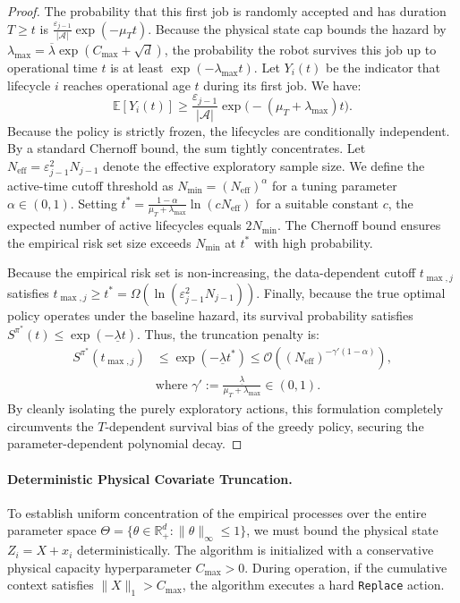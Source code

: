 \documentclass[letterpaper, 10 pt, conference]{IEEEconf}
\begin{document}
\begin{proof}
    The probability that this first job is randomly accepted and has duration $T \ge t$ is $\frac{\varepsilon_{j-1}}{|\mathcal{A}|} \exp(-\mu_T t)$. Because the physical state cap bounds the hazard by $\lambda_{\max} = \overline{\lambda}\exp(C_{\max} + \sqrt{d})$, the probability the robot survives this job up to operational time $t$ is at least $\exp(-\lambda_{\max} t)$. Let $Y_i(t)$ be the indicator that lifecycle $i$ reaches operational age $t$ during its first job. We have:
    \begin{equation}
        \mathbb{E}[Y_i(t)] \ge \frac{\varepsilon_{j-1}}{|\mathcal{A}|} \exp\big(-(\mu_T + \lambda_{\max})t\big).
    \end{equation}
    Because the policy is strictly frozen, the lifecycles are conditionally independent. By a standard Chernoff bound, the sum tightly concentrates. Let $N_{\mathrm{eff}} = \varepsilon_{j-1}^2 N_{j-1}$ denote the effective exploratory sample size. We define the active-time cutoff threshold as $N_{\min} = (N_{\mathrm{eff}})^\alpha$ for a tuning parameter $\alpha \in (0,1)$. Setting $t^* = \frac{1-\alpha}{\mu_T + \lambda_{\max}} \ln\left( c N_{\mathrm{eff}} \right)$ for a suitable constant $c$, the expected number of active lifecycles equals $2 N_{\min}$. The Chernoff bound ensures the empirical risk set size exceeds $N_{\min}$ at $t^*$ with high probability.

    Because the empirical risk set is non-increasing, the data-dependent cutoff $t_{\max,j}$ satisfies $t_{\max,j} \ge t^* = \Omega(\ln(\varepsilon_{j-1}^2 N_{j-1}))$. Finally, because the true optimal policy operates under the baseline hazard, its survival probability satisfies $S^{\pi^*}(t) \le \exp(-\underline{\lambda} t)$. Thus, the truncation penalty is:
    \begin{align}
        S^{\pi^*}(t_{\max,j}) &\le \exp(-\underline{\lambda} t^*) \le \mathcal{O}\left( (N_{\mathrm{eff}})^{-\gamma'(1-\alpha)} \right), \\
        &\text{where } \gamma' := \frac{\underline{\lambda}}{\mu_T + \lambda_{\max}} \in (0,1).
    \end{align}
    By cleanly isolating the purely exploratory actions, this formulation completely circumvents the $T$-dependent survival bias of the greedy policy, securing the parameter-dependent polynomial decay.
\end{proof}

\paragraph{Deterministic Physical Covariate Truncation.}
To establish uniform concentration of the empirical processes over the entire parameter space $\Theta = \{ \theta \in \mathbb{R}^d_+ : \|\theta\|_\infty \leq 1 \}$, we must bound the physical state $Z_i = X + x_i$ deterministically. The algorithm is initialized with a conservative physical capacity hyperparameter $C_{\max} > 0$. During operation, if the cumulative context satisfies $\|X\|_1 > C_{\max}$, the algorithm executes a hard \texttt{Replace} action.
\end{document}
